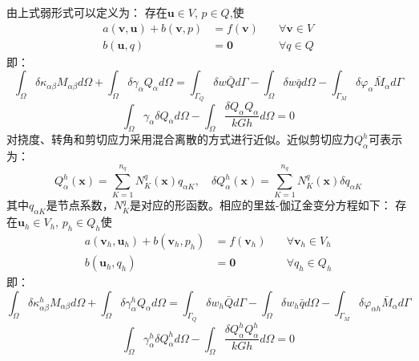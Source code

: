 由上式弱形式可以定义为：
存在$\boldsymbol u \in V$, $p \in Q$,使
\begin{equation}
    \begin{aligned}
        a(\boldsymbol v, \boldsymbol u) + b(\boldsymbol v, p) &= f(\boldsymbol v) \quad &\forall \boldsymbol v \in V \\
        b(\boldsymbol u, q) &= \boldsymbol 0 \quad &\forall q \in Q
    \end{aligned}
\end{equation}
即：
\begin{equation}\label{mindlin_weak1}
    \int_{\Omega}\delta\kappa_{\alpha \beta}M_{\alpha \beta}d\Omega+\int_{\Omega}\delta\gamma_{\alpha}Q_{\alpha}d\Omega=\int_{\Gamma_{Q}}\delta{w}{\bar Q}d\Gamma-\int_{\Omega} \delta{w}\bar{q}d\Omega-\int_{\Gamma_{M}}\delta\varphi_{\alpha}{{\bar M}_{\alpha}}d\Gamma
\end{equation}
\begin{equation}\label{mindlin_weak2}
    \int_{\Omega}\gamma_{\alpha}\delta{Q}_{\alpha}d\Omega-\int_{\Omega}\frac{\delta{Q}_{\alpha}{Q}_{\alpha}}{kGh}d\Omega=0
\end{equation}
对挠度、转角和剪切应力采用混合离散的方式进行近似。近似剪切应力$Q_\alpha^h$可表示为：
\begin{equation}\label{Q_h}
    Q^h_\alpha(\boldsymbol x) = \sum_{K=1}^{n_q} N^q_K(\boldsymbol x) q_{\alpha K},\quad \delta Q^h_\alpha(\boldsymbol x) = \sum_{K=1}^{n_q} N^q_K(\boldsymbol x) \delta q_{\alpha K}
\end{equation}
其中$q_{\alpha K}$是节点系数，$N^q_K$是对应的形函数。相应的里兹-伽辽金变分方程如下：
存在$\boldsymbol u_h \in V_h$, $p_h \in Q_h$使
\begin{equation}
    \begin{aligned}
        a(\boldsymbol v_h, \boldsymbol u_h) + b(\boldsymbol v_h, p_h) &= f(\boldsymbol v_h) \quad &\forall \boldsymbol v_h \in V_h \\
        b(\boldsymbol u_h, q_h) &= \boldsymbol 0 \quad &\forall q_h \in Q_h
    \end{aligned}
\end{equation}
即：
\begin{equation}\label{mindlin_ritz1}
    \int_{\Omega}\delta\kappa^h_{\alpha \beta}M_{\alpha \beta}d\Omega+\int_{\Omega}\delta\gamma^h_{\alpha}Q_{\alpha}d\Omega=\int_{\Gamma_{Q}}\delta{w_h}{\bar Q}d\Gamma-\int_{\Omega} \delta{w_h}\bar{q}d\Omega-\int_{\Gamma_{M}}\delta\varphi_{\alpha h}{{\bar M}_{\alpha}}d\Gamma
\end{equation}
\begin{equation}\label{mindlin_ritz2}
    \int_{\Omega}\gamma^h_{\alpha}\delta{Q}^h_{\alpha}d\Omega-\int_{\Omega}\frac{\delta{Q}^h_{\alpha}{Q}^h_{\alpha}}{kGh}d\Omega=0
\end{equation}

